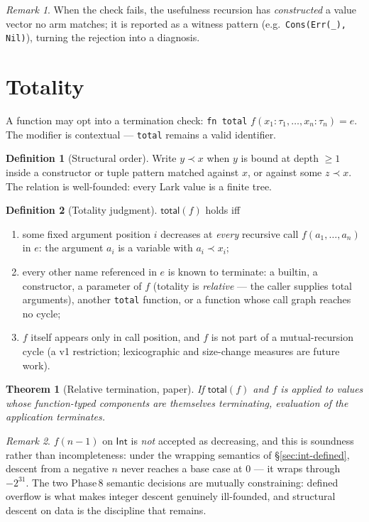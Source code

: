 \documentclass[10pt,a4paper]{article}
\newcommand{\TInt}{\mathsf{Int}}
\theoremstyle{plain}
\newtheorem{theorem}{Theorem}
\theoremstyle{definition}
\newtheorem{definition}{Definition}
\theoremstyle{remark}
\newtheorem{remark}{Remark}
\begin{document}
\begin{remark}
When the check fails, the usefulness recursion has \emph{constructed} a
value vector no arm matches; it is reported as a witness pattern
(e.g.\ \texttt{Cons(Err(\_), Nil)}), turning the rejection into a
diagnosis.
\end{remark}

\section{Totality}
\label{sec:totality}

A function may opt into a termination check:
\texttt{fn total} $f(x_1{:}\tau_1,\ldots,x_n{:}\tau_n) = e$.
The modifier is contextual --- \texttt{total} remains a valid identifier.

\begin{definition}[Structural order]
Write $y \prec x$ when $y$ is bound at depth ${\ge}1$ inside a constructor
or tuple pattern matched against $x$, or against some $z \prec x$.  The
relation is well-founded: every Lark value is a finite tree.
\end{definition}

\begin{definition}[Totality judgment]
$\mathsf{total}(f)$ holds iff
\begin{enumerate}
\item some fixed argument position $i$ decreases at \emph{every} recursive
      call $f(a_1,\ldots,a_n)$ in $e$: the argument $a_i$ is a variable
      with $a_i \prec x_i$;
\item every other name referenced in $e$ is known to terminate: a builtin,
      a constructor, a parameter of $f$ (totality is \emph{relative} --- the
      caller supplies total arguments), another \texttt{total} function, or
      a function whose call graph reaches no cycle;
\item $f$ itself appears only in call position, and $f$ is not part of a
      mutual-recursion cycle (a v1 restriction; lexicographic and
      size-change measures are future work).
\end{enumerate}
\end{definition}

\begin{theorem}[Relative termination, paper]
If $\mathsf{total}(f)$ and $f$ is applied to values whose function-typed
components are themselves terminating, evaluation of the application
terminates.
\end{theorem}

\begin{remark}
$f(n-1)$ on $\TInt$ is \emph{not} accepted as decreasing, and this is
soundness rather than incompleteness: under the wrapping semantics of
\S\ref{sec:int-defined}, descent from a negative $n$ never reaches a base
case at $0$ --- it wraps through $-2^{31}$.  The two Phase\,8 semantic
decisions are mutually constraining: defined overflow is what makes
integer descent genuinely ill-founded, and structural descent on data is
the discipline that remains.
\end{remark}
\end{document}
